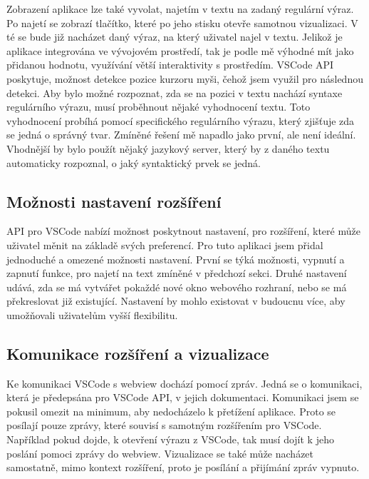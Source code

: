 Zobrazení aplikace lze také vyvolat, najetím v textu na zadaný regulární výraz.
Po najetí se zobrazí tlačítko, které po jeho stisku otevře samotnou vizualizaci.
V té se bude již nacházet daný výraz, na který uživatel najel v textu.
Jelikož je aplikace integrována ve vývojovém prostředí, tak je podle mě výhodné mít jako přidanou hodnotu, využívání větší interaktivity s prostředím.
VSCode API poskytuje, možnost detekce pozice kurzoru myši, čehož jsem využil pro následnou detekci.
Aby bylo možné rozpoznat, zda se na pozici v textu nachází syntaxe regulárního výrazu, musí proběhnout nějaké vyhodnocení textu.
Toto vyhodnocení probíhá pomocí specifického regulárního výrazu, který zjišťuje zda se jedná o správný tvar.
Zmíněné řešení mě napadlo jako první, ale není ideální.
Vhodnější by bylo použít nějaký jazykový server, který by z daného textu automaticky rozpoznal, o jaký syntaktický prvek se jedná.

\subsection*{Možnosti nastavení rozšíření}

API pro VSCode nabízí možnost poskytnout nastavení, pro rozšíření, které může uživatel měnit na základě svých preferencí.
Pro tuto aplikaci jsem přidal jednoduché a omezené možnosti nastavení.
První se týká možnosti, vypnutí a zapnutí funkce, pro najetí na text zmíněné v předchozí sekci.
Druhé nastavení udává, zda se má vytvářet pokaždé nové okno webového rozhraní, nebo se má překreslovat již existující.
Nastavení by mohlo existovat v budoucnu více, aby umožňovali uživatelům vyšší flexibilitu. 


\subsection*{Komunikace rozšíření a vizualizace}

Ke komunikaci VSCode s webview dochází pomocí zpráv.
Jedná se o komunikaci, která je předepsána pro VSCode API, v jejich dokumentaci.
Komunikaci jsem se pokusil omezit na minimum, aby nedocházelo k přetížení aplikace.
Proto se posílají pouze zprávy, které souvisí s samotným rozšířením pro VSCode.
Například pokud dojde, k otevření výrazu z VSCode, tak musí dojít k jeho poslání pomoci zprávy do webview.
Vizualizace se také může nacházet samostatně, mimo kontext rozšíření, proto je posílání a přijímání zpráv vypnuto.


